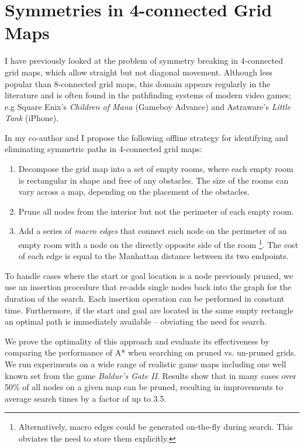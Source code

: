 \section{Symmetries in 4-connected Grid Maps}
\label{sec:currentwork}
I have previously looked at the problem of symmetry breaking in 4-connected
grid maps, which allow straight but not diagonal movement.  Although less popular
than 8-connected grid maps, this domain appears regularly in the literature
\cite{yap02} and is often found in the pathfinding systems of
modern video games; e.g Square Enix's \emph{Children of Mana} (Gameboy Advance)
and Astraware's \emph{Little Tank} (iPhone).
\par 
In \cite{harabor10} my co-author and I propose the following offline strategy 
for identifying and eliminating symmetric paths in 4-connected grid maps:
\begin{enumerate}
\item{Decompose the grid map into a set of empty rooms, where each empty room is 
rectangular in shape and free of any obstacles. 
The size of the rooms can vary across a map, depending
on the placement of the obstacles.}
\item{Prune all nodes from the interior but not the perimeter of each empty
room.}
\item{Add a series of \emph{macro edges} that connect each node on the perimeter of an empty room
with a node on the directly opposite side of the room 
\footnote{Alternatively, macro edges could be generated on-the-fly during search. 
This obviates the need to store them explicitly.}.
The cost of each edge is equal to the Manhattan distance between its two endpoints.
}
\end{enumerate}

To handle cases where the start or goal location is a node previously pruned, we
use an insertion procedure that re-adds single nodes back into the graph for the
duration of the search.
Each insertion operation can be performed in constant time.
Furthermore, if the start and goal are located in the same empty rectangle
an optimal path is immediately available -- obviating the need for search.
\par
We prove the optimality of this approach and evaluate its effectiveness by 
comparing the performance of A* when searching on pruned vs. un-pruned grids.
We run experiments on a wide range of realistic game maps including one well
known set from the game \emph{Baldur's Gate II}.  Results show that in many
cases over 50\% of all nodes on a given map can be pruned, resulting in
improvements to average search times by a factor of up to 3.5.

